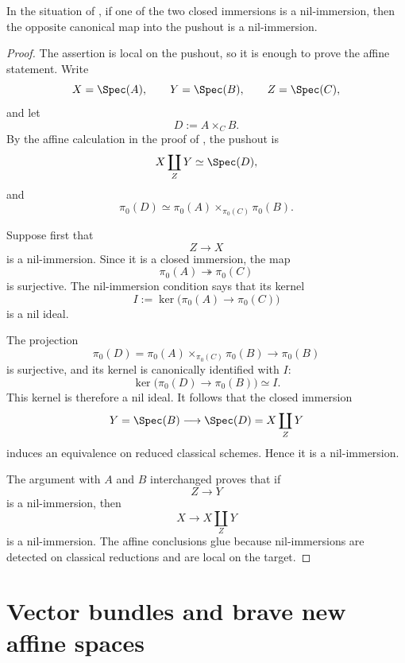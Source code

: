 \begin{proposition}
\label{prop:pushout-nil-immersions}
In the situation of , if one of
the two closed immersions is a nil-immersion, then the opposite canonical
map into the pushout is a nil-immersion.
\end{proposition}
\begin{proof}
The assertion is local on the pushout, so it is enough to prove the
affine statement. Write
\[
    X=\Spec(A),
    \qquad
    Y=\Spec(B),
    \qquad
    Z=\Spec(C),
\]
and let
\[
    D
    :=
    A\times_CB.
\]
By the affine calculation in the proof of
,
the pushout is
\[
    X\coprod_ZY
    \simeq
    \Spec(D),
\]
and
\[
    \pi_0(D)
    \simeq
    \pi_0(A)
    \times_{\pi_0(C)}
    \pi_0(B).
\]

Suppose first that
\[
    Z
    \longrightarrow
    X
\]
is a nil-immersion. Since it is a closed immersion, the map
\[
    \pi_0(A)
    \twoheadrightarrow
    \pi_0(C)
\]
is surjective. The nil-immersion condition says that its kernel
\[
    I
    :=
    \ker
    \bigl(
        \pi_0(A)
        \longrightarrow
        \pi_0(C)
    \bigr)
\]
is a nil ideal.

The projection
\[
    \pi_0(D)
    =
    \pi_0(A)
    \times_{\pi_0(C)}
    \pi_0(B)
    \longrightarrow
    \pi_0(B)
\]
is surjective, and its kernel is canonically identified with \(I\):
\[
    \ker
    \bigl(
        \pi_0(D)
        \longrightarrow
        \pi_0(B)
    \bigr)
    \simeq
    I.
\]
This kernel is therefore a nil ideal. It follows that the closed
immersion
\[
    Y
    =
    \Spec(B)
    \longrightarrow
    \Spec(D)
    =
    X\coprod_ZY
\]
induces an equivalence on reduced classical schemes. Hence it is a
nil-immersion.

The argument with \(A\) and \(B\) interchanged proves that if
\[
    Z
    \longrightarrow
    Y
\]
is a nil-immersion, then
\[
    X
    \longrightarrow
    X\coprod_ZY
\]
is a nil-immersion. The affine conclusions glue because nil-immersions
are detected on classical reductions and are local on the target.
\end{proof}

\section{Vector bundles and brave new affine spaces}
\label{sec:vector-bundles-brave-new-affine-spaces}

